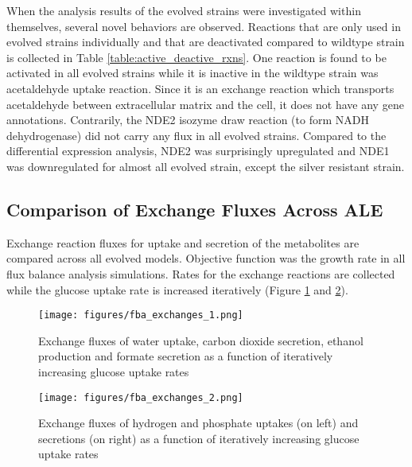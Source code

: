 

When the analysis results of the evolved strains were investigated within themselves, several novel behaviors are observed. Reactions that are only used in evolved strains individually and that are deactivated compared to wildtype strain is collected in Table \ref{table:active_deactive_rxns}. One reaction is found to be activated in all evolved strains while it is inactive in the wildtype strain was acetaldehyde uptake reaction. Since it is an exchange reaction which transports acetaldehyde between extracellular matrix and the cell, it does not have any gene annotations. Contrarily, the NDE2 isozyme draw reaction (to form NADH dehydrogenase) did not carry any flux in all evolved strains. Compared to the differential expression analysis, NDE2 was surprisingly upregulated and NDE1 was downregulated for almost all evolved strain, except the silver resistant strain.



\subsection{Comparison of Exchange Fluxes Across ALE}

Exchange reaction fluxes for uptake and secretion of the metabolites are compared across all evolved models. Objective function was the growth rate in all flux balance analysis simulations. Rates for the exchange reactions are collected while the glucose uptake rate is increased iteratively (Figure \ref{fig:fba_exchanges_1} and \ref{fig:fba_exchanges_2}).

\begin{figure}[H]
  \begin{center}
  \texttt{[image: figures/fba\_exchanges\_1.png]}
  \caption[Exchange fluxes of water, carbon dioxide, ethanol and formate secretion as a function of iteratively increasing glucose uptake rates]{Exchange fluxes of water uptake, carbon dioxide secretion, ethanol production and formate secretion as a function of iteratively increasing glucose uptake rates}
  \label{fig:fba_exchanges_1}
  \end{center}
  \end{figure}
\vspace{-1.0cm}

\begin{figure}[H]
  \begin{center}
  \texttt{[image: figures/fba\_exchanges\_2.png]}
  \caption[Exchange fluxes of hydrogen and phosphate uptakes (on the left) and secretions (on the right) as a function of iteratively increasing glucose uptake rates]{Exchange fluxes of hydrogen and phosphate uptakes (on left) and secretions (on right) as a function of iteratively increasing glucose uptake rates}
  \label{fig:fba_exchanges_2}
  \end{center}
  \end{figure}
\vspace{-1.0cm}

